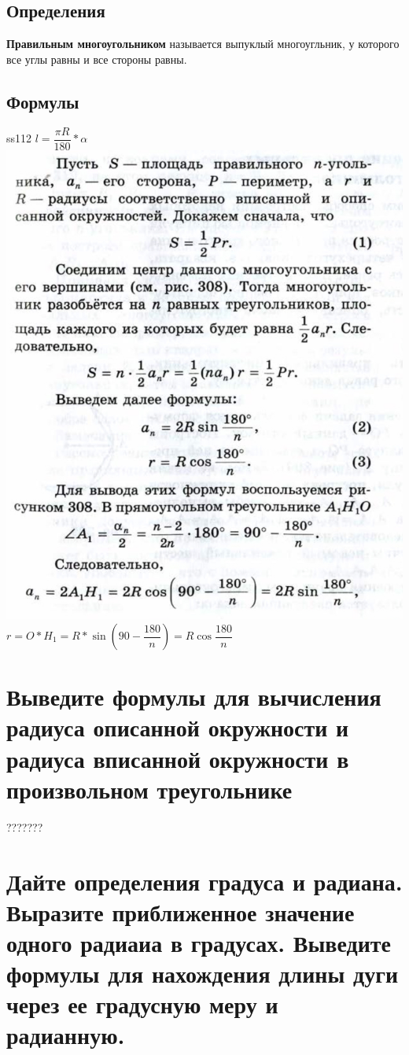 \documentclass[12pt, letterpaper]{article}
\begin{document}
\subsection{Определения}
\textbf{Правильным многоугольником} называется выпуклый многоугльник, у которого все углы равны и все стороны равны. \\
\subsection{Формулы}
ss112
$l=\dfrac{\pi R}{180}*\alpha $\\
\includegraphics[scale=0.3]{legal-3.jpg} \\
$ r=O*H_1=R*\sin(90-\dfrac{180}{n})=R\cos \dfrac{180}{n} $ \\

\section {Выведите формулы для вычисления радиуса описанной окружности и радиуса вписанной окружности в произвольном треугольнике}
???????

\section {Дайте определения градуса и радиана. Выразите приближенное значение одного радиаиа в градусах. Выведите формулы для нахождения длины дуги через ее градусную меру и радианную.}
\end{document}
